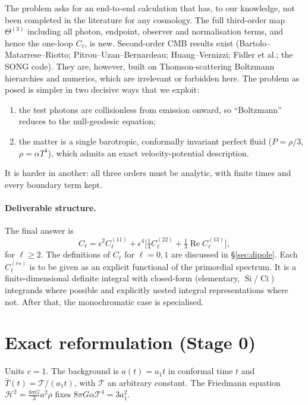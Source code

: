 \documentclass[11pt]{article}
\theoremstyle{definition}
\theoremstyle{remark}
\newcommand{\Tref}{\mathcal{T}}
\newcommand{\eps}{\epsilon}
\begin{document}
The problem asks for an end-to-end calculation that has, to our knowledge,
not been completed in the literature for any cosmology. The full
third-order map $\Theta^{(3)}$ including all photon, endpoint, observer and
normalisation terms, and hence the one-loop $C_\ell$, is new. Second-order
CMB results exist (Bartolo--Matarrese--Riotto; Pitrou--Uzan--Bernardeau;
Huang--Vernizzi; Fidler et al.; the SONG code). They are, however, built on
Thomson-scattering Boltzmann hierarchies and numerics, which are irrelevant
or forbidden here. The problem as posed is simpler in two decisive ways that
we exploit:
\begin{enumerate}
\item the test photons are collisionless from emission onward, so ``Boltzmann''
reduces to the null-geodesic equation;
\item the matter is a single barotropic, conformally invariant perfect fluid
($P=\rho/3$, $\rho=\alpha T^4$), which admits an exact velocity-potential
description.
\end{enumerate}
It is harder in another: all three orders must be analytic, with finite
times and every boundary term kept.

\paragraph{Deliverable structure.} The final answer is
\[
C_\ell=\eps^2C_\ell^{(11)}+\eps^4\Big[\tfrac14 C_\ell^{(22)}+\tfrac13\operatorname{Re}C_\ell^{(13)}\Big],
\]
for $\ell\ge2$. The definitions of $C_\ell$ for $\ell=0,1$ are discussed in
\S\ref{sec:dipole}. Each $C^{(rs)}_\ell$ is to be given as an explicit
functional of the primordial spectrum. It is a finite-dimensional definite
integral with closed-form (elementary, $\operatorname{Si}$/$\operatorname{Ci}$)
integrands where possible and explicitly nested integral representations
where not. After that, the monochromatic case is specialised.

\section{Exact reformulation (Stage 0)}\label{sec:exact}

Units $c=1$. The background is $a(t)=a_1 t$ in conformal time $t$ and
$\bar T(t)=\Tref/(a_1t)$, with $\Tref$ an arbitrary constant. The Friedmann
equation $\mathcal H^2=\tfrac{8\pi G}{3}a^2\rho$ fixes
$8\pi G\alpha\Tref^4=3a_1^2$.
\end{document}
